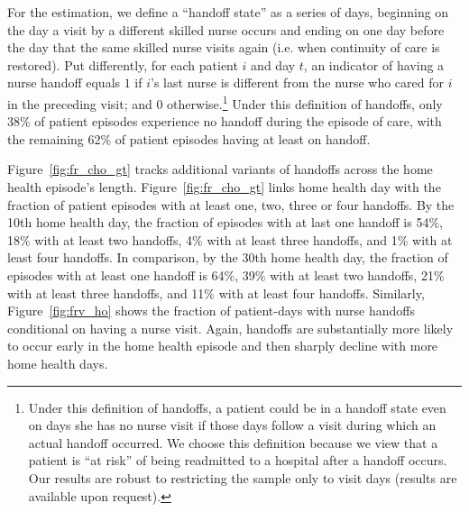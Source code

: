 \documentclass[final,12pt, notitlepage]{article}
\begin{document}
For the estimation, we define a ``handoff state'' as a series of days, beginning on the day a visit by a different skilled nurse occurs and ending on one day before the day that the same skilled nurse visits again (i.e. when continuity of care is restored). Put differently, for each patient $i$ and day $t$, an indicator of having a nurse handoff equals $1$ if $i$'s last nurse is different from the nurse who cared for $i$ in the preceding visit; and $0$ otherwise.\footnote{Under this definition of handoffs, a patient could be in a handoff state even on days she has no nurse visit if those days follow a visit during which an actual handoff occurred.  We choose this definition because we view that a patient is ``at risk'' of being readmitted to a hospital after a handoff occurs.
Our results are robust to restricting the sample only to visit days (results are available upon request).
}
Under this definition of handoffs, only 38\% of patient episodes experience no handoff during the episode of care, with the remaining 62\% of patient episodes having at least on handoff.

Figure~\ref{fig:fr_cho_gt} tracks additional variants of handoffs across the home health episode's length.
Figure~\ref{fig:fr_cho_gt} links home health day with the fraction of patient episodes with at least one, two, three or four handoffs.
By the 10th home health day, the fraction of episodes with at last one handoff is 54\%, 18\% with at least two handoffs, 4\% with at least  three handoffs, and 1\% with at least four handoffs.
In comparison, by the 30th home health day, the fraction of episodes with at least one handoff is 64\%, 39\% with at least two handoffs, 21\% with at least three handoffs, and 11\% with at least four handoffs.
Similarly, Figure~\ref{fig:frv_ho} shows the fraction of patient-days with nurse handoffs conditional on having a nurse visit.
Again, handoffs are substantially more likely to occur early in the home health episode and then sharply decline with more home health days.


\end{document}
